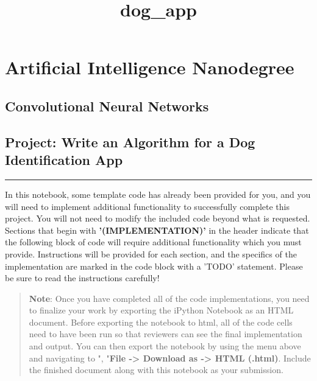 \documentclass[11pt]{article}
\title{dog\_app}
\begin{document}
    
    
    \maketitle
    
    

    
    \section{Artificial Intelligence
Nanodegree}\label{artificial-intelligence-nanodegree}

\subsection{Convolutional Neural
Networks}\label{convolutional-neural-networks}

\subsection{Project: Write an Algorithm for a Dog Identification
App}\label{project-write-an-algorithm-for-a-dog-identification-app}

\begin{center}\rule{0.5\linewidth}{\linethickness}\end{center}

In this notebook, some template code has already been provided for you,
and you will need to implement additional functionality to successfully
complete this project. You will not need to modify the included code
beyond what is requested. Sections that begin with
\textbf{'(IMPLEMENTATION)'} in the header indicate that the following
block of code will require additional functionality which you must
provide. Instructions will be provided for each section, and the
specifics of the implementation are marked in the code block with a
'TODO' statement. Please be sure to read the instructions carefully!

\begin{quote}
\textbf{Note}: Once you have completed all of the code implementations,
you need to finalize your work by exporting the iPython Notebook as an
HTML document. Before exporting the notebook to html, all of the code
cells need to have been run so that reviewers can see the final
implementation and output. You can then export the notebook by using the
menu above and navigating to \n", "\textbf{File -\textgreater{} Download
as -\textgreater{} HTML (.html)}. Include the finished document along
with this notebook as your submission.
\end{quote}
\end{document}
